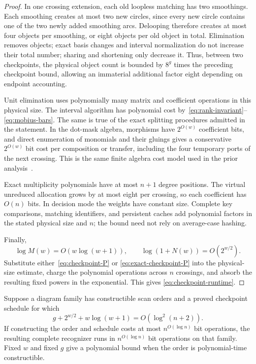 \begin{proof}
In one crossing extension, each old loopless matching has two
smoothings. Each smoothing creates at most two new circles, since every
new circle contains one of the two newly added smoothing arcs. Delooping
therefore creates at most four objects per smoothing, or eight objects
per old object in total. Elimination removes objects; exact basis
changes and interval normalization do not increase their total number;
sharing and shortening only decrease it. Thus, between two checkpoints,
the physical object count is bounded by $8^g$ times the preceding
checkpoint bound, allowing an immaterial additional factor eight
depending on endpoint accounting.

Unit elimination uses polynomially many matrix and coefficient
operations in this physical size. The interval algorithm has
polynomial cost by~\eqref{eq:rank-invariant}--\eqref{eq:mobius-bars}.
The same is true of the exact splitting procedures admitted in the
statement. In the dot-mask algebra, morphisms have $2^{O(w)}$ coefficient
bits, and direct enumeration of monomials and their gluings gives a
conservative $2^{O(w)}$ bit cost per composition or transfer, including
the four temporary ports of the next crossing. This is the same finite
algebra cost model used in the prior analysis~\cite{prior}.

Exact multiplicity polynomials have at most $n+1$ degree positions.
The virtual unreduced allocation grows by at most eight per crossing,
so each coefficient has $O(n)$ bits. In decision mode the weights have
constant size. Complete key comparisons, matching identifiers, and
persistent caches add polynomial factors in the stated physical size
and $n$; the bound need not rely on average-case hashing.

Finally,
\[
 \log M(w)=O(w\log(w+1)),\qquad
 \log(1+N(w))=O(2^{w/2}).
\]
Substitute either~\eqref{eq:checkpoint-P} or
\eqref{eq:exact-checkpoint-P} into the physical-size estimate, charge
the polynomial operations across $n$ crossings, and absorb the
resulting fixed powers in the exponential. This gives
\eqref{eq:checkpoint-runtime}.
\end{proof}

\begin{corollary}
\label{cor:checkpoint-quasipolynomial}
Suppose a diagram family has constructible scan orders and a proved
checkpoint schedule for which
\begin{equation}\label{eq:checkpoint-qp-condition}
 g+2^{w/2}+w\log(w+1)=O(\log^2(n+2)).
\end{equation}
If constructing the order and schedule costs at most $n^{O(\log n)}$
bit operations, the resulting complete recognizer runs in
$n^{O(\log n)}$ bit operations on that family. Fixed $w$ and fixed $g$
give a polynomial bound when the order is polynomial-time constructible.
\end{corollary}

